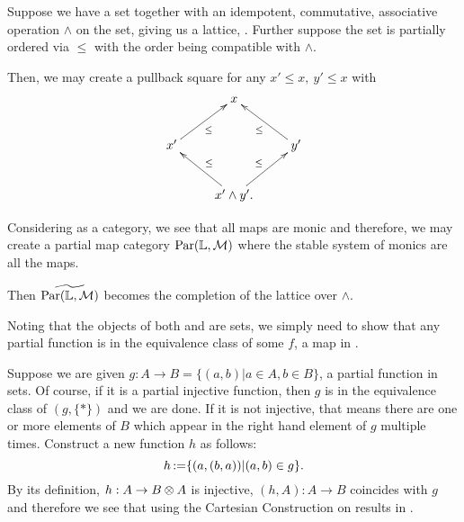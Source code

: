 \begin{example}\label{example:lattice_completion}
  Suppose we have a set together with an idempotent, commutative, associative operation $\wedge$ on
  the set, giving us a lattice, \Lat. Further suppose the set is partially ordered via $\le$ with
  the order being compatible with $\wedge$.

  Then, we may create a pullback square for any $x' \le x,\ y' \le x$ with
  \[
    \xymatrix{
      &x\\
      x' \ar[ur]_{\le} & & y' \ar[ul]^{\le}\\
      &x'\wedge y'.  \ar[ul]_{\le} \ar[ur]^{\le}
    }
  \]

  Considering \Lat as a category, we see that all maps are monic and therefore, we may create a
  partial map category $\text{Par}(\mathbb{L},\mathcal{M})$ where the stable system of monics are all the maps.

  Then $\widetilde{\text{Par}(\mathbb{L},\mathcal{M})}$ becomes the completion of the lattice over $\wedge$.
\end{example}
\begin{example}\label{ex:tilde_pinj_is_par}
  Noting that the objects of both \pinj and \Par are sets, we simply need to show that any partial
  function is in the equivalence class of some $f$, a map in \pinj.

  Suppose we are given $g : A \to B = \{(a,b) | a \in A, b\in B\}$, a partial function in sets. Of
  course, if it is a partial injective function, then $g$ is in the equivalence class of $(g,\{*\})$
  and we are done.  If it is not injective, that means there are one or more elements of $B$ which
  appear in the right hand element of $g$ multiple times. Construct a new function $h$ as follows:
  \begin{equation}
     h \operatorname*{:\!=} \{(a,(b,a)) | (a,b) \in g\}. \label{eq:new_partial_injective}
  \end{equation}
  By its definition, $h : A \to B \otimes A$ is injective, $(h,A): A \to B$ coincides with $g$ and therefore
  we see that using the Cartesian Construction on \pinj results in \Par.
\end{example}



